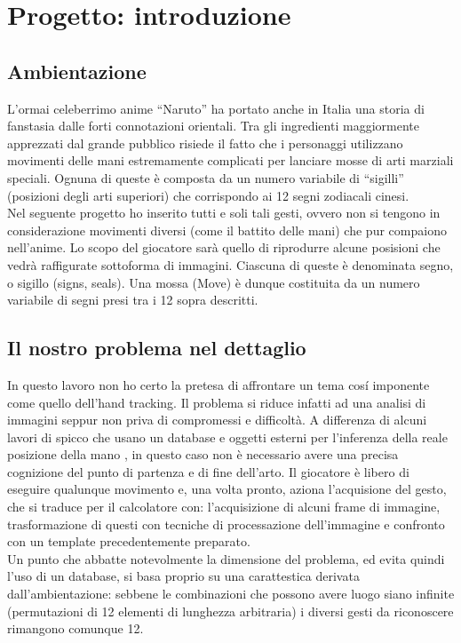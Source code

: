 \documentclass[a4paper,10pt, twocolumn]{article}
\begin{document}
\section{Progetto: introduzione}
  \subsection{Ambientazione}
  L'ormai celeberrimo anime ``Naruto'' ha portato anche in Italia una storia di fanstasia
  dalle forti connotazioni orientali. Tra gli ingredienti maggiormente apprezzati dal
  grande pubblico risiede il fatto che i personaggi utilizzano movimenti 
  delle mani estremamente complicati per lanciare mosse di arti marziali speciali.
  Ognuna di queste \`{e} composta da un numero variabile di ``sigilli'' (posizioni degli arti
  superiori) che corrispondo ai 12 segni zodiacali cinesi.\\
  Nel seguente progetto ho inserito tutti e soli tali gesti, ovvero non si tengono in considerazione
  movimenti diversi (come il battito delle mani) che pur compaiono nell'anime.
  Lo scopo del giocatore sar\`{a} quello di riprodurre
  alcune posisioni che vedr\`{a} raffigurate sottoforma di immagini. Ciascuna
  di queste \`{e} denominata segno, o sigillo (signs, seals). Una mossa (Move) \`{e} dunque
  costituita da un numero variabile di segni presi tra i 12 sopra descritti.
  
  \subsection{Il nostro problema nel dettaglio}
  In questo lavoro non ho certo la pretesa di affrontare un tema cos\'{i} imponente come 
  quello dell'hand tracking. Il problema si riduce infatti ad una analisi di immagini
  seppur non priva di compromessi e difficolt\`{a}. A differenza di alcuni lavori
  di spicco che usano un database e oggetti esterni
  per l'inferenza della reale posizione della mano \cite{mitGlove}, in questo caso non
  \`{e} necessario avere una precisa cognizione del punto di partenza e di 
  fine dell'arto.
  Il giocatore \`{e} libero di eseguire qualunque movimento e, una volta pronto,
  aziona l'acquisione del gesto, che si traduce per il calcolatore con: l'acquisizione 
  di alcuni frame di immagine, trasformazione di questi con tecniche di processazione
  dell'immagine e confronto con un template precedentemente preparato.\\
  Un punto che abbatte notevolmente la dimensione del problema, ed evita quindi l'uso 
  di un database, si basa proprio su una carattestica derivata dall'ambientazione:
  sebbene le combinazioni che possono avere luogo siano infinite (permutazioni di 12 
  elementi di lunghezza arbitraria) i diversi gesti da riconoscere rimangono comunque 12.
  
\end{document}

